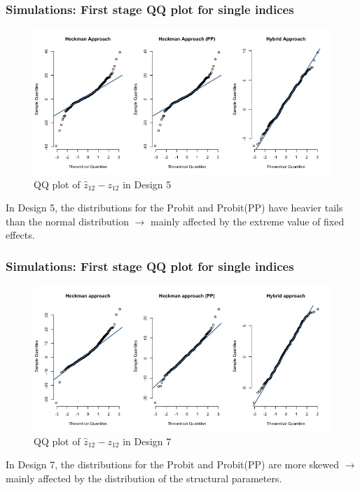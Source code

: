 \begin{frame}
  \frametitle{Simulations: First stage QQ plot for single indices}
  \begin{figure}[htbp]
      \centerline{\includegraphics[scale=.35]{content/Figures/QQ_Zij_Design5.png}}
      \caption{\footnotesize{QQ plot of $\hat{z}_{12} - z_{12}$ in Design 5}}
      \label{QQ_Zij_Design5}
    \end{figure}
    In Design 5, the distributions for the Probit and Probit(PP) have heavier tails than the normal distribution $\xrightarrow{}$ mainly affected by the extreme value of fixed effects.
\end{frame}

\begin{frame}
  \frametitle{Simulations: First stage QQ plot for single indices}
  \begin{figure}[htbp]
      \centerline{\includegraphics[scale=.35]{content/Figures/QQ_Zij_Design7.png}}
      \caption{\footnotesize{QQ plot of $\hat{z}_{12} - z_{12}$ in Design 7}}
      \label{QQ_Zij_Design7}
    \end{figure}
    In Design 7, the distributions for the Probit and Probit(PP) are more skewed $\xrightarrow{}$ mainly affected by the distribution of the structural parameters.
\end{frame}


